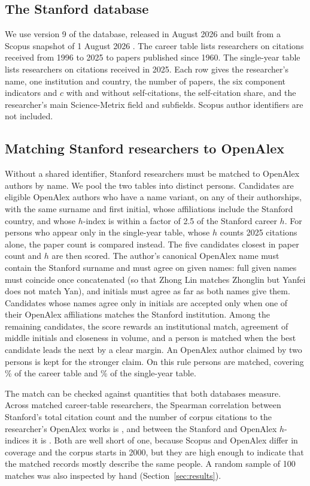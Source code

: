 \subsection{The Stanford database}

We use version 9 of the database, released in August 2026 and built from a Scopus snapshot of 1 August 2026 \citep{ioannidisUpdatedSciencewideAuthor2020}. The career table lists \NStCareer{} researchers on citations received from 1996 to 2025 to papers published since 1960. The single-year table lists \NStSingle{} researchers on citations received in 2025. Each row gives the researcher's name, one institution and country, the number of papers, the six component indicators and $c$ with and without self-citations, the self-citation share, and the researcher's main Science-Metrix field and subfields. Scopus author identifiers are not included.

\subsection{Matching Stanford researchers to OpenAlex}

Without a shared identifier, Stanford researchers must be matched to OpenAlex authors by name. We pool the two tables into \NStPersons{} distinct persons. Candidates are eligible OpenAlex authors who have a name variant, on any of their authorships, with the same surname and first initial, whose affiliations include the Stanford country, and whose $h$-index is within a factor of 2.5 of the Stanford career $h$. For persons who appear only in the single-year table, whose $h$ counts 2025 citations alone, the paper count is compared instead. The five candidates closest in paper count and $h$ are then scored. The author's canonical OpenAlex name must contain the Stanford surname and must agree on given names: full given names must coincide once concatenated (so that Zhong Lin matches Zhonglin but Yanfei does not match Yan), and initials must agree as far as both names give them. Candidates whose names agree only in initials are accepted only when one of their OpenAlex affiliations matches the Stanford institution. Among the remaining candidates, the score rewards an institutional match, agreement of middle initials and closeness in volume, and a person is matched when the best candidate leads the next by a clear margin. An OpenAlex author claimed by two persons is kept for the stronger claim. On this rule \NMatchMatched{} persons are matched, covering \NMatchCareerPct{}\% of the career table and \NMatchSinglePct{}\% of the single-year table.

The match can be checked against quantities that both databases measure. Across matched career-table researchers, the Spearman correlation between Stanford's total citation count and the number of corpus citations to the researcher's OpenAlex works is \NCheckNcRho{}, and between the Stanford and OpenAlex $h$-indices it is \NCheckHRho{}. Both are well short of one, because Scopus and OpenAlex differ in coverage and the corpus starts in 2000, but they are high enough to indicate that the matched records mostly describe the same people. A random sample of 100 matches was also inspected by hand (Section~\ref{sec:results}).

